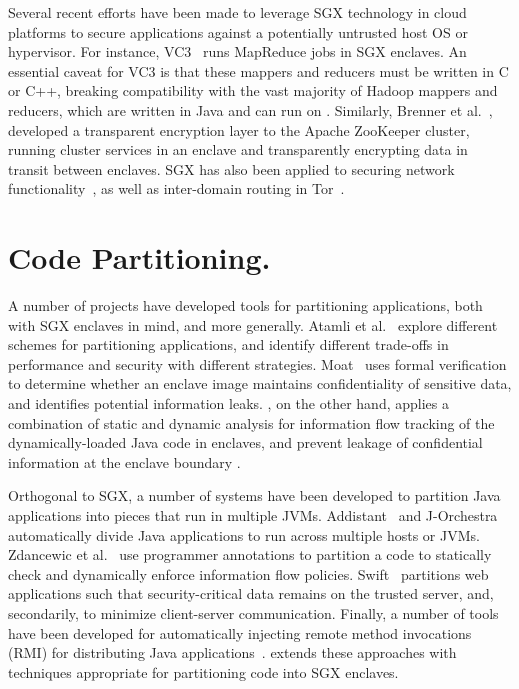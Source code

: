 Several recent efforts have been made to leverage SGX technology
in cloud platforms to secure applications against a potentially untrusted host OS or hypervisor.
For instance, VC3~\citep{vc3} runs MapReduce jobs in SGX enclaves.
An essential caveat for VC3 is that these mappers and reducers must be written
in C or C++, breaking compatibility with the vast majority of Hadoop mappers and reducers,
which are written in Java and can run on \sysname{}.
Similarly, Brenner et al.~\citep{zookeeper}, developed a transparent encryption 
layer to the Apache ZooKeeper cluster,
running cluster services in an enclave and transparently encrypting data in transit between enclaves.
SGX has also been applied to securing network functionality~\citep{shih2016s},
as well as inter-domain routing in Tor~\citep{kim2015first}.

\section{Code Partitioning.}

A number of projects have developed tools for partitioning applications, both with SGX enclaves in mind, and more generally.
Atamli et al.~\citep{atamli2015securing} explore different schemes for partitioning applications,
and identify different trade-offs in performance and security with different strategies.
Moat~\citep{moat} uses formal verification to determine whether an enclave
image maintains confidentiality of sensitive data,
and identifies potential information leaks.  \sysname{}, on the other hand, applies
a combination of static and dynamic analysis for information flow tracking of the dynamically-loaded Java code in enclaves, and prevent leakage of confidential information at the enclave boundary .%

Orthogonal to SGX, a number of systems have been developed to 
partition Java applications into pieces that run in multiple JVMs.
Addistant~\citep{addistant} and J-Orchestra~\citep{jorchestra}
automatically divide Java applications to run across multiple hosts or JVMs.
Zdancewic et al.~\citep{jif-split} use programmer annotations
to partition a code to statically check and dynamically enforce 
information flow policies.
Swift~\citep{swift} partitions web applications such that
security-critical data remains on the trusted server,
and, secondarily, to minimize client-server communication.
Finally, a number of tools have been developed for automatically injecting remote method invocations (RMI)
for distributing Java applications~\citep{philippsen1997javaparty, czajkowski2002code, spiegel1999pangaea, tilevich2008nrmi, aridor1999cjvm, diaconescu2005compiler}.
\sysname{} extends these approaches with techniques appropriate
for partitioning code into SGX enclaves.


